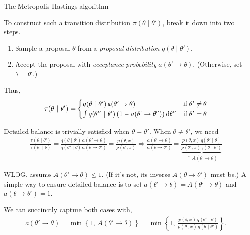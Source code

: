 \documentclass[aspectratio=169]{beamer}
\begin{document}
\begin{frame}[t,allowframebreaks]{The Metropolis-Hastings
algorithm}\label{the-metropolis-hastings-algorithm}

To construct such a transition distribution
\(\pi(\theta \mid \theta')\), break it down into two steps.

\begin{enumerate}
\item
  Sample a proposal \(\theta\) from a \emph{proposal distribution}
  \(q(\theta \mid \theta')\),
\item
  Accept the proposal with \emph{acceptance probability}
  \(a(\theta' \to \theta)\). (Otherwise, set \(\theta = \theta'\).)
\end{enumerate}

Thus, \begin{align*}
\pi(\theta ~\vert~ \theta') = 
\begin{cases}
q(\theta ~\vert~ \theta') \, a(\theta' \to \theta) & \text{if } \theta' \neq \theta \\
\int q(\theta'' ~\vert~ \theta') \, (1 - a(\theta' \to \theta'')) \mathop{}\!\mathrm{d} \theta'' & \text{if } \theta' = \theta
\end{cases}
\end{align*}

Detailed balance is trivially satisfied when \(\theta = \theta'\). When
\(\theta \neq \theta'\), we need \begin{align*}
\frac{\pi(\theta \mid \theta')}{\pi(\theta' \mid \theta)} = \frac{q(\theta \mid \theta') \, a(\theta' \to \theta)}{q(\theta' \mid \theta) \, a(\theta \to \theta')} = \frac{p(\theta, x)}{p(\theta', x)} \Rightarrow \frac{a(\theta' \to \theta)}{a(\theta \to \theta')} = \underbrace{\frac{p(\theta, x) \, q(\theta' \mid \theta)}{p(\theta', x) \, q(\theta \mid \theta')}}_{\triangleq A(\theta' \to \theta)}
\end{align*}

WLOG, assume $ A(\theta' \to \theta) \leq 1$. (If it's not, its
inverse \(A(\theta \to \theta')\) must be.) A simple way to ensure
detailed balance is to set
\(a(\theta' \to \theta) = A(\theta' \to \theta)\) and
\(a(\theta \to \theta') = 1\).

We can succinctly capture both cases with, 
\begin{align*}
a(\theta' \to \theta) = \min \left\{1, \, A(\theta' \to \theta) \right \} = \min \left\{1, \, \frac{p(\theta, x) \, q(\theta' \mid \theta)}{p(\theta', x) \, q(\theta \mid \theta')} \right\}.
\end{align*}

\end{frame}
\end{document}
